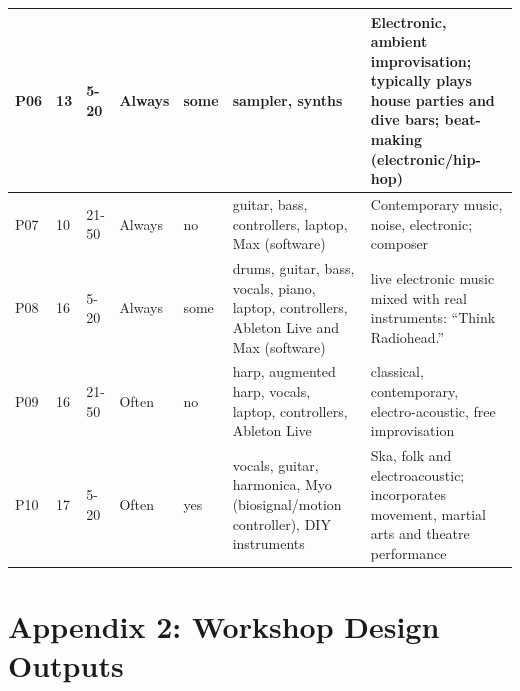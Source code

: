 \documentclass[letterpaper, 12pt]{article}
\begin{document}
\begin{spacing}{1.1}
\begin{longtable}{ C{0.6cm} C{1.1cm} C{1.3cm} C{1.3cm} C{1.3cm} L{3.2cm} L{4.6cm} }
        P06 &
        13 &
        5-20 &
        Always &
        some &
        sampler, synths &
        Electronic, ambient improvisation; typically plays house parties and dive bars; beat-making (electronic/hip-hop) \\ \hline
        
        P07 &
        10 &
        21-50 &
        Always &
        no &
        guitar, bass, controllers, laptop, Max (software) &
        Contemporary music, noise, electronic; composer \\ \hline
        
        P08 &
        16 &
        5-20 &
        Always &
        some &
        drums, guitar, bass, vocals, piano, laptop, controllers, Ableton Live and Max (software) &
        live electronic music mixed with real instruments: ``Think Radiohead.'' \\ \hline
        
        P09 &
        16 &
        21-50 &
        Often &
        no &
        harp, augmented harp, vocals, laptop, controllers, Ableton Live &
        classical, contemporary, electro-acoustic, free improvisation \\ \hline
        
        P10 &
        17 &
        5-20 &
        Often &
        yes &
        vocals, guitar, harmonica, Myo (biosignal/motion controller), DIY instruments &
        Ska, folk and electroacoustic; incorporates movement, martial arts and theatre performance \\ \hline
    \end{longtable}
\end{spacing}

\pagebreak

\section*{Appendix 2: Workshop Design Outputs}
\end{document}
